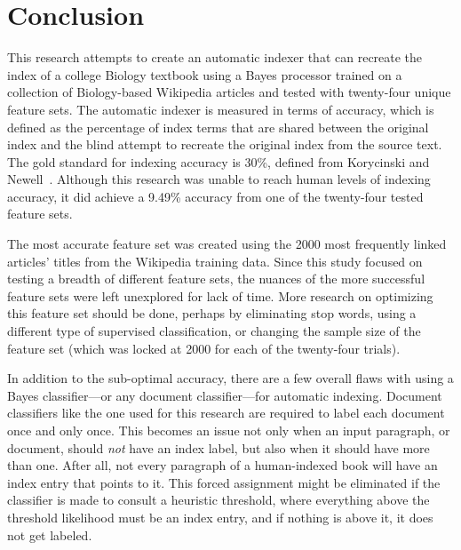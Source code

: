 \pagebreak
\section{Conclusion}

This research attempts to create an automatic indexer that can recreate the index of a college Biology textbook using a \naive Bayes processor trained on a collection of Biology-based Wikipedia articles and tested with twenty-four unique feature sets.
The automatic indexer is measured in terms of accuracy, which is defined as the percentage of index terms that are shared between the original index and the blind attempt to recreate the original index from the source text.
The gold standard for indexing accuracy is 30\%, defined from Korycinski and Newell~\cite{automatic-indexing}.
Although this research was unable to reach human levels of indexing accuracy, it did achieve a 9.49\% accuracy from one of the twenty-four tested feature sets.

The most accurate feature set was created using the 2000 most frequently linked articles' titles from the Wikipedia training data.
Since this study focused on testing a breadth of different feature sets, the nuances of the more successful feature sets were left unexplored for lack of time.
More research on optimizing this feature set should be done, perhaps by eliminating stop words, using a different type of supervised classification, or changing the sample size of the feature set (which was locked at 2000 for each of the twenty-four trials).

In addition to the sub-optimal accuracy, there are a few overall flaws with using a \naive Bayes classifier---or any document classifier---for automatic indexing.
Document classifiers like the one used for this research are required to label each document once and only once.
This becomes an issue not only when an input paragraph, or document, should {\it not} have an index label, but also when it should have more than one.
After all, not every paragraph of a human-indexed book will have an index entry that points to it.
This forced assignment might be eliminated if the classifier is made to consult a heuristic threshold, where everything above the threshold likelihood must be an index entry, and if nothing is above it, it does not get labeled.


